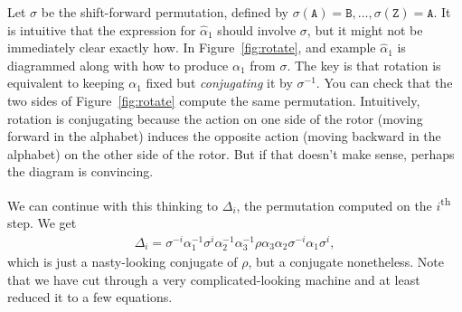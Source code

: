 \documentclass[11pt]{article}
\newcommand{\hatalpha}{\hat{\alpha}}
\begin{document}
Let $\sigma$ be the shift-forward permutation, defined by $\sigma(\mathtt{A}) =
\mathtt{B}, \ldots, \sigma(\mathtt{Z}) = \mathtt{A}$. It is intuitive that the
expression for $\hatalpha_1$ should involve $\sigma$, but it might not be
immediately clear exactly how.  In Figure~\ref{fig:rotate}, and example
$\hatalpha_1$ is diagrammed along with how to produce $\alpha_1$ from $\sigma$.
The key is that rotation is equivalent to keeping $\alpha_1$ fixed but
\emph{conjugating} it by $\sigma^{-1}$. You can check that the two sides of
Figure~\ref{fig:rotate} compute the same permutation. Intuitively, rotation is
conjugating because the action on one side of the rotor (moving forward in the
alphabet) induces the opposite action (moving backward in the alphabet) on the
other side of the rotor. But if that doesn't make sense, perhaps the diagram
is convincing.

We can continue with this thinking to $\Delta_i$, the permutation computed
on the $i$\textsuperscript{th} step. We get
\begin{align}\label{eq:enigmapermi}
    \Delta_i = \sigma^{-i}\alpha_1^{-1}\sigma^{i} \alpha_2^{-1}\alpha_3^{-1}\rho
    \alpha_3\alpha_2\sigma^{-i}\alpha_1\sigma^i,
\end{align}
which is just a nasty-looking conjugate of $\rho$, but a conjugate nonetheless.
Note that we have cut through a very complicated-looking machine and at least
reduced it to a few equations.
\end{document}
